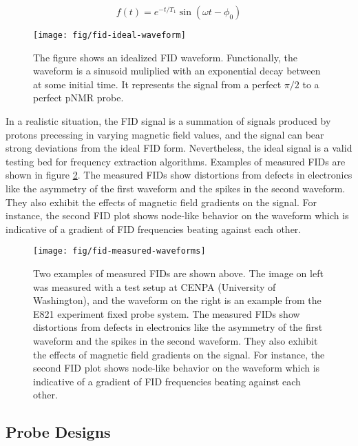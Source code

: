 \begin{equation}
f(t) = e^{-t/T_1} \sin(\omega t - \phi_0)
\label{eqn:ideal-fid}
\end{equation}

\begin{figure}
\centering
\texttt{[image: fig/fid-ideal-waveform]}
\caption{
    The figure shows an idealized FID waveform. Functionally, the waveform is a sinusoid muliplied with an exponential decay between at some initial time.  It represents the signal from a perfect $\pi/2$ to a perfect pNMR probe.
    \label{fig:fid-ideal-waveform}
}
\end{figure}

In a realistic situation, the FID signal is a summation of signals produced by protons precessing in varying magnetic field values, and the signal can bear strong deviations from the ideal FID form.  Nevertheless, the ideal signal is a valid testing bed for frequency extraction algorithms.  Examples of measured FIDs are shown in figure \ref{fig:fid-measured-waveforms}.  The measured FIDs show distortions from defects in electronics like the asymmetry of the first waveform and the spikes in the second waveform.  They also exhibit the effects of magnetic field gradients on the signal.  For instance, the second FID plot shows node-like behavior on the waveform which is indicative of a gradient of FID frequencies beating against each other.

\begin{figure}
\centering
\texttt{[image: fig/fid-measured-waveforms]}
\caption{
    Two examples of measured FIDs are shown above. The image on left was measured with a test setup at CENPA (University of Washington), and the waveform on the right is an example from the E821 experiment fixed probe system.  The measured FIDs show distortions from defects in electronics like the asymmetry of the first waveform and the spikes in the second waveform.  They also exhibit the effects of magnetic field gradients on the signal.  For instance, the second FID plot shows node-like behavior on the waveform which is indicative of a gradient of FID frequencies beating against each other.
    \label{fig:fid-measured-waveforms}
}
\end{figure}

\subsection{Probe Designs}

